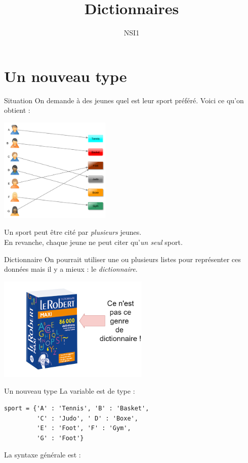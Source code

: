 \documentclass[10pt]{beamer}
\title{Dictionnaires}
\author{NSI1}
\begin{document}
\maketitle
\section{Un nouveau type}
\begin{frame}{Situation}\pause
On demande à des jeunes quel est leur sport préféré.\pause
Voici ce qu'on obtient :
\begin{center}
    \includegraphics[height = 5cm]{img/dico_1}
\end{center}
Un sport peut être cité par \emph{plusieurs} jeunes.\\
En revanche, chaque jeune ne peut citer qu'\emph{un seul} sport.
\end{frame}
\begin{frame}[fragile]{Dictionnaire}
On pourrait utiliser une ou plusieurs listes pour représenter ces données mais il y a mieux : le \textit{dictionnaire}.\pause
\begin{center}
    \includegraphics[height = 5cm]{img/dico_blague}
\end{center}
\end{frame}

\begin{frame}[fragile]{Un nouveau type}
La variable  est de type  :\pause
\begin{verbatim}
sport = {'A' : 'Tennis', 'B' : 'Basket',
         'C' : 'Judo', ' D' : 'Boxe',
         'E' : 'Foot', 'F' : 'Gym',
         'G' : 'Foot'}
\end{verbatim}
\pause
La syntaxe générale est :

\end{frame}
\end{document}
